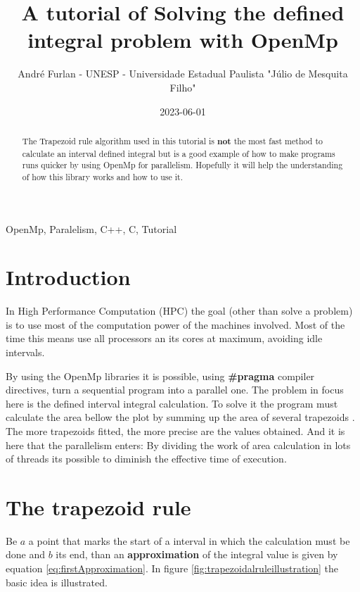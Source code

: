 


	\title{A tutorial of Solving the defined integral problem with OpenMp}
	\author{André Furlan - UNESP - Universidade Estadual Paulista "Júlio de Mesquita Filho"}
	\date{2023-06-01}
	\maketitle
	
	\begin{abstract}
		The Trapezoid rule algorithm used in this tutorial is \textbf{not} the most fast method to calculate an interval defined integral but is a good example of how to make programs runs quicker by using OpenMp for parallelism. Hopefully it will help the understanding of how this library works and how to use it.
	\end{abstract}
	
	\begin{IEEEkeywords}
		OpenMp, Paralelism, C++, C, Tutorial
	\end{IEEEkeywords}
	
	\section{Introduction}
	\par In High Performance Computation (HPC) the goal (other than solve a problem) is to use most of the computation power of the machines involved. Most of the time this means use all processors an its cores at maximum, avoiding idle intervals.
	\par By using the OpenMp \cite{openmp08} libraries it is possible, using \textbf{\#pragma} compiler directives, turn a sequential program into a parallel one. The problem in focus here is the defined interval integral calculation. To solve it the program must calculate the area bellow the plot by summing up the area of several trapezoids \cite{hildebrand1987introduction}. The more trapezoids fitted, the more precise are the values obtained. And it is here that the parallelism enters: By dividing the work of area calculation in lots of threads its possible to diminish the effective time of execution.
	\section{The trapezoid rule}
	\par Be $a$ a point that marks the start of a interval in which the calculation must be done and $b$ its end, than an \textbf{approximation} of the integral value is given by equation \ref{eq:firstApproximation}. In figure \ref{fig:trapezoidalruleillustration} the basic idea is illustrated.\newline
	
